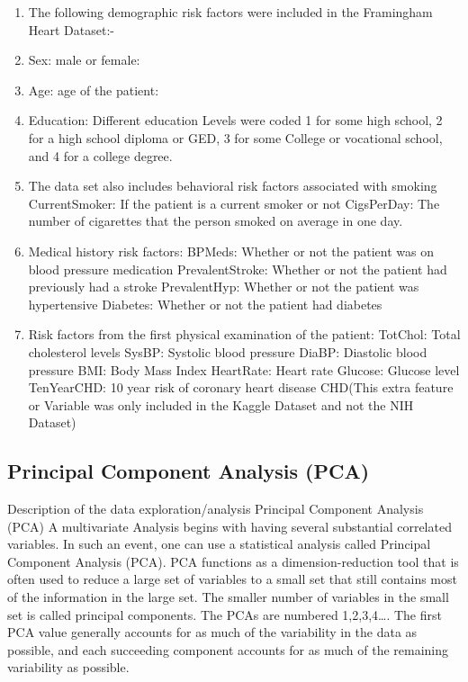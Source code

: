 \documentclass[]{article}
\providecommand{\tightlist}{%
  \setlength{\itemsep}{0pt}\setlength{\parskip}{0pt}}
\begin{document}
\begin{enumerate}
\def\labelenumi{\arabic{enumi}.}
\tightlist
\item
  The following demographic risk factors were included in the Framingham
  Heart Dataset:-
\item
  Sex: male or female:
\item
  Age: age of the patient:
\item
  Education: Different education Levels were coded 1 for some high
  school, 2 for a high school diploma or GED, 3 for some College or
  vocational school, and 4 for a college degree.
\item
  The data set also includes behavioral risk factors associated with
  smoking CurrentSmoker: If the patient is a current smoker or not
  CigsPerDay: The number of cigarettes that the person smoked on average
  in one day.
\item
  Medical history risk factors: BPMeds: Whether or not the patient was
  on blood pressure medication PrevalentStroke: Whether or not the
  patient had previously had a stroke PrevalentHyp: Whether or not the
  patient was hypertensive Diabetes: Whether or not the patient had
  diabetes
\item
  Risk factors from the first physical examination of the patient:
  TotChol: Total cholesterol levels SysBP: Systolic blood pressure
  DiaBP: Diastolic blood pressure BMI: Body Mass Index HeartRate: Heart
  rate Glucose: Glucose level TenYearCHD: 10 year risk of coronary heart
  disease CHD(This extra feature or Variable was only included in the
  Kaggle Dataset and not the NIH Dataset)
\end{enumerate}

\subsection{Principal Component Analysis
(PCA)}\label{principal-component-analysis-pca}

Description of the data exploration/analysis Principal Component
Analysis (PCA) A multivariate Analysis begins with having several
substantial correlated variables. In such an event, one can use a
statistical analysis called Principal Component Analysis (PCA). PCA
functions as a dimension-reduction tool that is often used to reduce a
large set of variables to a small set that still contains most of the
information in the large set. The smaller number of variables in the
small set is called principal components. The PCAs are numbered
1,2,3,4\ldots{}. The first PCA value generally accounts for as much of
the variability in the data as possible, and each succeeding component
accounts for as much of the remaining variability as possible.
\end{document}
